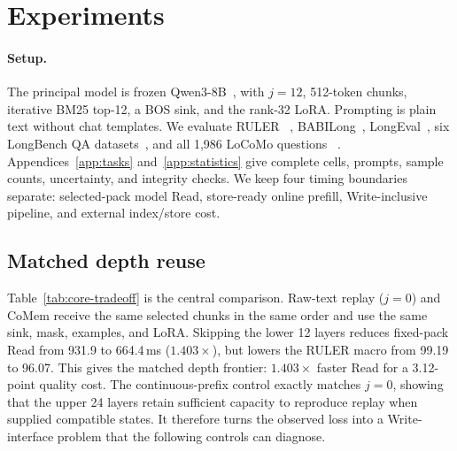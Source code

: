 \section{Experiments}
\label{sec:experiments}

\paragraph{Setup.}
The principal model is frozen Qwen3-8B~\citep{qwen3}, with $j{=}12$,
512-token chunks, iterative BM25 top-12, a BOS sink, and the rank-32 LoRA.
Prompting is plain text without chat templates. We evaluate RULER
~\citep{ruler}, BABILong~\citep{babilong}, LongEval~\citep{longchat}, six
LongBench QA datasets~\citep{longbench}, and all 1,986 LoCoMo questions
~\citep{locomo}. Appendices~\ref{app:tasks} and~\ref{app:statistics} give
complete cells, prompts, sample counts, uncertainty, and integrity checks. We keep four
timing boundaries separate: selected-pack model Read, store-ready online
prefill, Write-inclusive pipeline, and external index/store cost.

\subsection{Matched depth reuse}


Table~\ref{tab:core-tradeoff} is the central comparison. Raw-text replay
($j{=}0$) and CoMem receive the same selected chunks in the same order and use
the same sink, mask, examples, and LoRA. Skipping the lower 12 layers reduces
fixed-pack Read from 931.9 to 664.4\,ms ($1.403\times$), but lowers the RULER
macro from 99.19 to 96.07. This gives the matched depth frontier: $1.403\times$ faster Read for a
3.12-point quality cost. The continuous-prefix control exactly matches $j{=}0$,
showing that the upper 24 layers retain sufficient capacity to reproduce replay
when supplied compatible states. It therefore turns the observed loss into a
Write-interface problem that the following controls can diagnose.


